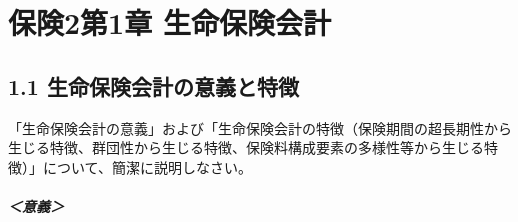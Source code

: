 \documentclass[report,gutter=10mm,fore-edge=10mm,uplatex,dvipdfmx]{jlreq}
\begin{document}
\chapter{保険2第1章 生命保険会計}

\section{1.1 生命保険会計の意義と特徴}


「生命保険会計の意義」および「生命保険会計の特徴（保険期間の超長期性から生じる特徴、群団性から生じる特徴、保険料構成要素の多様性等から生じる特徴）」について、簡潔に説明しなさい。


\paragraph{＜意義＞}
\end{document}
